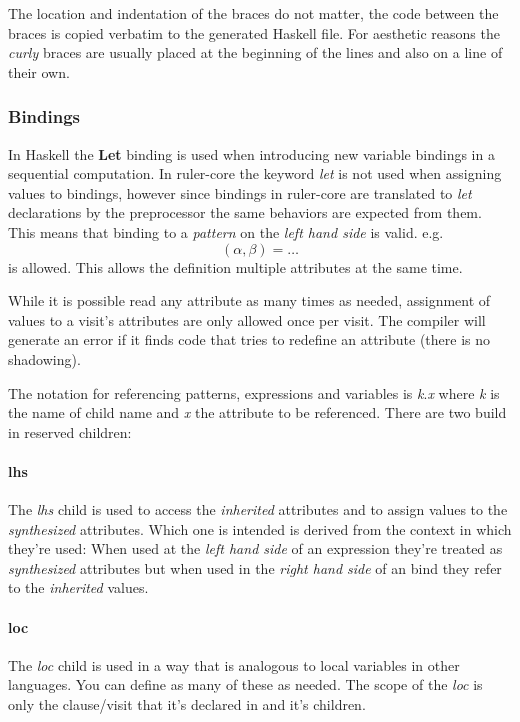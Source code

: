 The location and indentation of the braces do not matter, the code between the braces is copied verbatim to the generated Haskell file. For aesthetic reasons the \emph{curly} braces are usually placed at the beginning of the lines and also on a line of their own. 

\subsubsection{Bindings}
In Haskell the \textbf{Let} binding is used when introducing new variable bindings in a sequential computation. In ruler-core the keyword \emph{let} is not used when assigning values to bindings, however since bindings in ruler-core are translated to \emph{let} declarations by the preprocessor the same behaviors are expected from them. This means that binding to a \emph{pattern} on the \emph{left hand side} is valid. e.g. \[ (\alpha, \beta) = \ldots \] is allowed. This allows the definition multiple attributes at the same time.

While it is possible read any attribute as many times as needed, assignment of values to a visit's attributes are only allowed once per visit. The compiler will generate an error if it finds code that tries to redefine an attribute (there is no shadowing).

The notation for referencing patterns, expressions and variables is \emph{k}.\emph{x} where \emph{k} is the name of child name and \emph{x} the attribute to be referenced. There are two build in reserved children:

\paragraph{lhs}
The \emph{lhs} child is used to access the \emph{inherited} attributes and to assign values to the \emph{synthesized} attributes. Which one is intended is derived from the context in which they're used: When used at the \emph{left hand side} of an expression they're treated as \emph{synthesized} attributes but when used in the \emph{right hand side} of an bind they refer to the \emph{inherited} values.
 
\paragraph{loc}
The \emph{loc} child is used in a way that is analogous to local variables in other languages. You can define as many of these as needed. The scope of the \emph{loc} is only the clause/visit that it's declared in and it's children.

